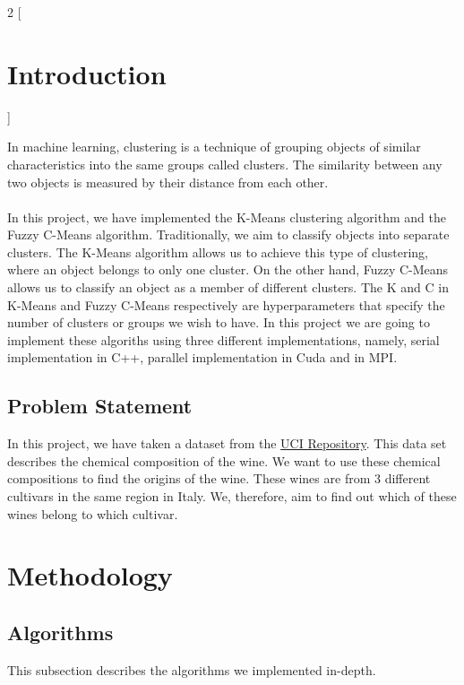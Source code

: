 \begin{multicols*}{2}
    [
        \section{Introduction}
    ]
    

    In machine learning, clustering is a technique of grouping objects of similar characteristics into the same groups called clusters. The similarity between any two objects is measured by their distance from each other. \\ \\
    In this project, we have implemented the K-Means clustering algorithm and the Fuzzy C-Means algorithm. Traditionally, we aim to classify objects into separate clusters. The K-Means algorithm allows us to achieve this type of clustering, where an object belongs to only one cluster. On the other hand, Fuzzy C-Means allows us to classify an object as a member of different clusters.
    The K and C in K-Means and Fuzzy C-Means respectively are hyperparameters that specify the number of clusters or groups we wish to have. In this project we are going to implement these algoriths using three different implementations, namely, serial implementation in C++, parallel implementation in Cuda and in MPI. 

    \subsection{Problem Statement}
    In this project, we have taken a dataset from the \href{https://archive.ics.uci.edu/ml/datasets/wine}{ UCI Repository}. This data set describes the chemical composition of the wine. We want to use these chemical compositions to find the origins of the wine. These wines are from 3 different cultivars in the same region in Italy. We, therefore, aim to find out which of these wines belong to which cultivar.

    \section{Methodology}
    \subsection{Algorithms}
    This subsection describes the algorithms we implemented in-depth. 

\end{multicols*}
